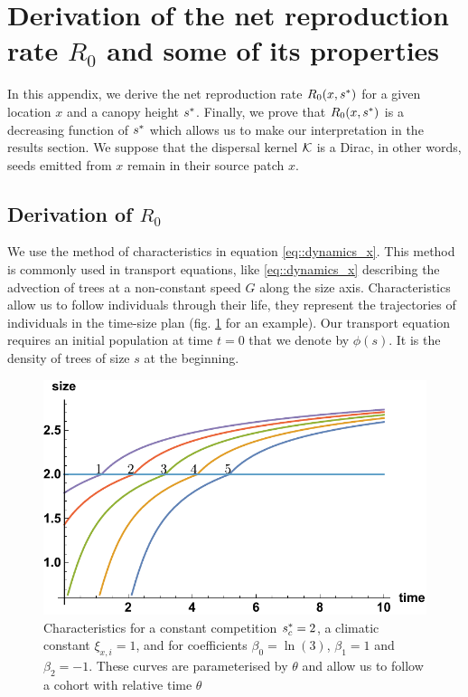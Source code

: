 \section{Derivation of the net reproduction rate $ R_0 $ and some of its properties} \label{app::calc_R0}
\begin{refsection}
In this appendix, we derive the net reproduction rate $ R_0(x, {s}^{*}) $ for a given location $ x $ and a canopy height $ {s}^{*} $. Finally, we prove that $ R_0(x, {s}^{*}) $ is a decreasing function of $ {s}^{*} $ which allows us to make our interpretation in the results section. We suppose that the dispersal kernel $ \mathcal{K} $ is a Dirac, in other words, seeds emitted from $ x $ remain in their source patch $ x $.

\subsection{Derivation of $ R_0 $ \label{app::calc_R0::sec::R0}}
We use the method of characteristics in equation \eqref{eq::dynamics_x}. This method is commonly used in transport equations, like \eqref{eq::dynamics_x} describing the advection of trees at a non-constant speed  $ G $ along the size axis. Characteristics allow us to follow individuals through their life, \ie they represent the trajectories of individuals in the time-size plan (fig. \ref{fig::chara} for an example). Our transport equation requires an initial population at time $ t = 0 $ that we denote by $ \phi(s) $. It is the density of trees of size $ s $ at the beginning.

\begin{figure}[h!]
	\includegraphics{../illustrations/chara}
	\caption{Characteristics for a constant competition $ {s}^{*}_c = 2 $, a climatic constant $ \xi_{x, i} = 1 $, and for coefficients $ \beta_0 = \ln(3) $, $ \beta_1 = 1 $ and $ \beta_2 = -1 $. These curves are parameterised by $ \theta $ and allow us to follow a cohort with relative time $ \theta $}
	\label{fig::chara}
\end{figure}


\end{refsection}
